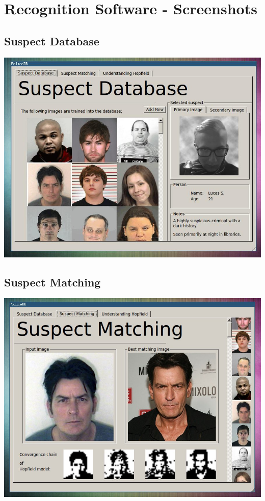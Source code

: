 \chapter{Recognition Software - Screenshots}

\section{Suspect Database}
\begin{center}
\includegraphics[scale=0.5]{screenshots-small/gui1.jpg}
\end{center}

\section{Suspect Matching}
\begin{center}
\includegraphics[scale=0.5]{screenshots-small/gui2.jpg}
\end{center}

